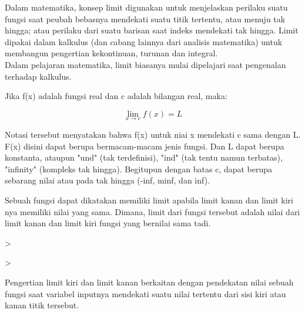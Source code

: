 \documentclass[a4paper,10pt]{article}
\begin{document}
\begin{eulernotebook}
\begin{eulercomment}
\begin{eulercomment}
\begin{eulercomment}
\begin{eulercomment}
\begin{eulercomment}
Dalam matematika, konsep limit digunakan untuk menjelaskan perilaku
suatu fungsi saat peubah bebasnya mendekati suatu titik tertentu, atau
menuju tak hingga; atau perilaku dari suatu barisan saat indeks
mendekati tak hingga. Limit dipakai dalam kalkulus (dan cabang lainnya
dari analisis matematika) untuk membangun pengertian kekontinuan,
turunan dan integral.\\
Dalam pelajaran matematika, limit biasanya mulai dipelajari saat
pengenalan terhadap kalkulus.

\begin{eulercomment}
\begin{eulercomment}
Jika f(x) adalah fungsi real dan c adalah bilangan real, maka:

\end{eulercomment}
\begin{eulerformula}
\[
\lim_{x \to c} f(x) = L
\]
\end{eulerformula}
\begin{eulercomment}
Notasi tersebut menyatakan bahwa f(x) untuk niai x mendekati c sama
dengan L. F(x) disini dapat berupa bermacam-macam jenis fungsi. Dan L
dapat berupa konstanta, ataupun "und" (tak terdefinisi), "ind" (tak
tentu namun terbatas), "infinity" (kompleks tak hingga). Begitupun
dengan batas c, dapat berupa sebarang nilai atau pada tak hingga
(-inf, minf, dan inf).

Sebuah fungsi dapat dikatakan memiliki limit apabila limit kanan dan
limit kiri nya memiliki nilai yang sama. Dimana, limit dari fungsi
tersebut adalah nilai dari limit kanan dan limit kiri fungsi yang
bernilai sama tadi.
\end{eulercomment}
\begin{eulerprompt}
>                                               
\end{eulerprompt}
\begin{eulerudf}
     
\end{eulerudf}
\begin{eulerprompt}
>     
\end{eulerprompt}
\begin{eulercomment}
Pengertian limit kiri dan limit kanan berkaitan dengan pendekatan
nilai sebuah fungsi saat variabel inputnya mendekati suatu nilai
tertentu dari sisi kiri atau kanan titik tersebut.



\end{eulercomment}
\end{eulercomment}
\end{eulercomment}
\end{eulercomment}
\end{eulercomment}
\end{eulercomment}
\end{eulercomment}
\end{eulernotebook}
\end{document}
